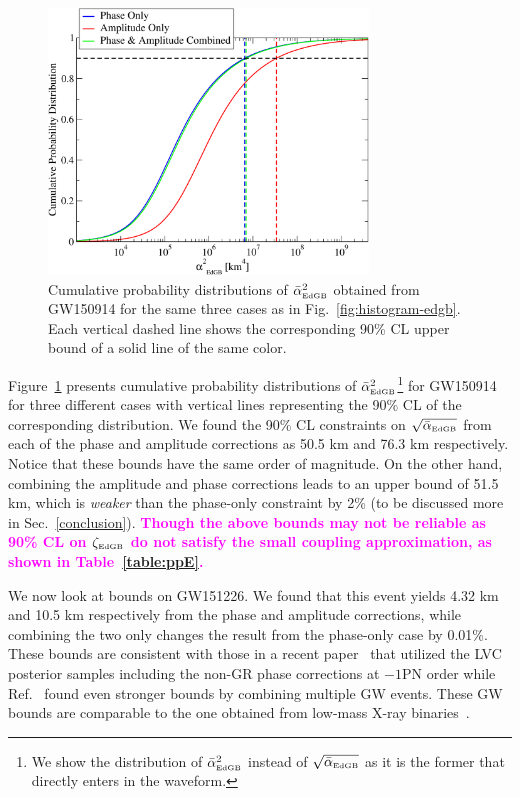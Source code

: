 \documentclass[prd,twocolumn,nofootinbib]{revtex4-1}
\newcommand{\EDGB}{{\mbox{\tiny EdGB}}}
\newcommand{\kent}[1]{\textcolor{magenta}{\textbf{#1}} }
\begin{document}
\begin{figure}[htb]
\includegraphics[width=8.5cm]{edgb-gw150914.pdf}
\caption{Cumulative probability distributions of $\bar{\alpha}^2_{\EDGB}$ obtained from GW150914 for the same three cases as in Fig.~\ref{fig:histogram-edgb}. Each vertical dashed line shows the corresponding 90\% CL upper bound of a solid line of the same color.}
\label{fig:pdf-edgb}
\end{figure}


Figure~\ref{fig:pdf-edgb} presents cumulative probability distributions of $\bar{\alpha}^2_{\EDGB}$\footnote{We show the distribution of $\bar{\alpha}^2_{\EDGB}$ instead of $\sqrt{\bar{\alpha}_{\EDGB}}$ as it is the former that directly enters in the waveform.} for GW150914 for three different cases with vertical lines representing the 90\% CL of the corresponding distribution. We found the 90\% CL constraints on  $\sqrt{\bar{\alpha}_{\EDGB}}$ from each of the phase and amplitude corrections as 50.5 km and 76.3 km respectively. Notice that these bounds have the same order of magnitude. On the other hand, combining the amplitude and phase corrections leads to an upper bound of 51.5 km, which is \emph{weaker} than the  phase-only constraint by 2\% (to be discussed more in Sec.~\ref{conclusion}). 
\kent{Though the above bounds may not be reliable as 90\% CL on $\zeta_\EDGB$ do not satisfy the small coupling approximation, as shown in Table~\ref{table:ppE}.}

We now look at bounds on GW151226. We found that this event yields 4.32 km and 10.5 km respectively from the phase and amplitude corrections, while combining the two only changes the result from the phase-only case by 0.01\%. These bounds are consistent with those in a recent paper~\cite{Nair:2019iur} that utilized the LVC posterior samples including the non-GR phase corrections at $-1$PN order while Ref.~\cite{Yamada:2019zrb} found even stronger bounds by combining multiple GW events. These GW bounds are comparable to the one obtained from low-mass X-ray binaries~\cite{Yagi:2012gp}. 
\end{document}

